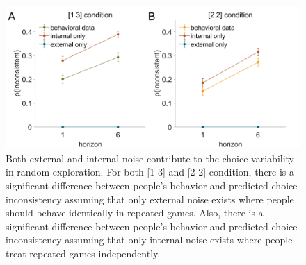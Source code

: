 \documentclass[12pt]{article}
\begin{document}
	\begin{figure}[h]
		\begin{center}
			\includegraphics[width=\textwidth]{figures/theory_da_info.png}
			\caption[Both external and internal noise contribute to the choice variability in random exploration]{Both external and internal noise contribute to the choice variability in random exploration. For both [1 3] and [2 2] condition, there is a significant difference between people's behavior and predicted choice inconsistency assuming that only external noise exists where people should behave identically in repeated games. Also, there is a significant difference between people's behavior and predicted choice inconsistency assuming that only internal noise exists where people treat repeated games independently. }
			\label{fig:mf2}
		\end{center}
	\end{figure}
	
\end{document}
